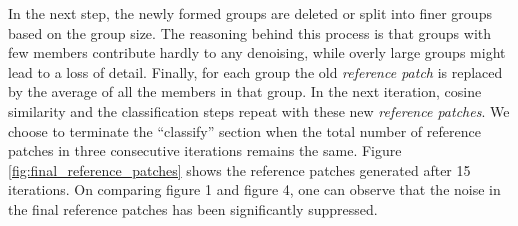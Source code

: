 \documentclass[fleqn,10pt]{wlscirep}
\begin{document}
	
	
	In the next step, the newly formed groups are deleted or split into finer groups based on the group size. The reasoning behind this process is that groups with few members contribute hardly to any denoising, while overly large groups might lead to a loss of detail.  Finally, for each group the old \textit{reference patch} is replaced by the average of all the members in that group. In the next iteration, cosine similarity and the classification steps repeat with these new \textit{reference patches}. We choose to terminate the “classify” section when the total number of reference patches in three consecutive iterations remains the same. Figure \ref{fig:final_reference_patches} shows the reference patches generated after 15 iterations. On comparing figure 1 and figure 4, one can observe that the noise in the final reference patches has been significantly suppressed.
	
\end{document}
